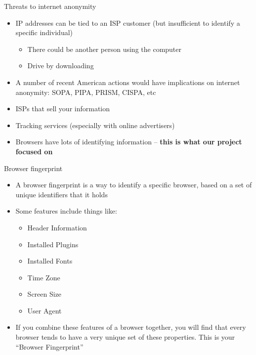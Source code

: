 \begin{frame}[fragile,t]{Threats to internet anonymity}
	\begin{itemize}
		\item IP addresses can be tied to an ISP customer (but insufficient to identify a specific individual)
		\begin{itemize}
			\item There could be another person using the computer
			\item Drive by downloading
		\end{itemize}
		\item A number of recent American actions would have implications on internet anonymity: SOPA, PIPA, PRISM, CISPA, etc
		\item ISPs that sell your information
		\item Tracking services (especially with online advertisers)
		\item Browsers have lots of identifying information -- \textbf{this is what our project focused on}
	\end{itemize}
\end{frame}

\begin{frame}[fragile,t]{Browser fingerprint}
	\begin{itemize}
		\item A browser fingerprint is a way to identify a specific browser, based on a set of unique identifiers that it holds
		\item Some features include things like:
		\begin{itemize}
			\item Header Information
			\item Installed Plugins
			\item Installed Fonts
			\item Time Zone
			\item Screen Size
			\item User Agent
		\end{itemize}
		\item If you combine these features of a browser together, you will find that every browser tends to have a very unique set of these properties. This is your ``Browser Fingerprint''
	\end{itemize}
\end{frame}

